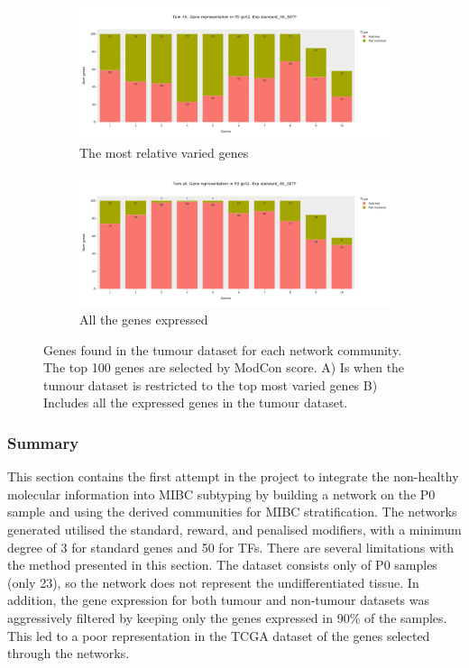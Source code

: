 \begin{figure}[!htb]
    \hfill
    \begin{subfigure}[b]{0.47\textwidth}
        \centering
        \includegraphics[width=\textwidth,keepaspectratio]{Sections/Network_I/Resources/P0/4K_p0_modConMev_rep_standard_4K_50TF_v3.png}
        \caption{The most relative varied genes}
    \end{subfigure}
    \hfill
    \begin{subfigure}[b]{0.47\textwidth}
        \centering
        \includegraphics[width=\textwidth,keepaspectratio]{Sections/Network_I/Resources/P0/13K_p0_modConMev_rep_standard_4K_50TF_v3.png}
        \caption{All the genes expressed}
    \end{subfigure}
    \hfill
    \caption{Genes found in the tumour dataset for each network community. The top 100 genes are selected by ModCon score. A) Is when the tumour dataset is restricted to the top most varied genes B) Includes all the expressed genes in the tumour dataset. }
    \label{fig:N_I:p0_mev_rep}
\end{figure}


\subsubsection{Summary}

This section contains the first attempt in the project to integrate the non-healthy molecular information into MIBC subtyping by building a network on the P0 sample and using the derived communities for MIBC stratification. The networks generated utilised the standard, reward, and penalised modifiers, with a minimum degree of 3 for standard genes and 50 for TFs. There are several limitations with the method presented in this section. The dataset consists only of P0 samples (only 23), so the network does not represent the undifferentiated tissue. In addition, the gene expression for both tumour and non-tumour datasets was aggressively filtered by keeping only the genes expressed in 90\% of the samples. This led to a poor representation in the TCGA dataset of the genes selected through the networks.


